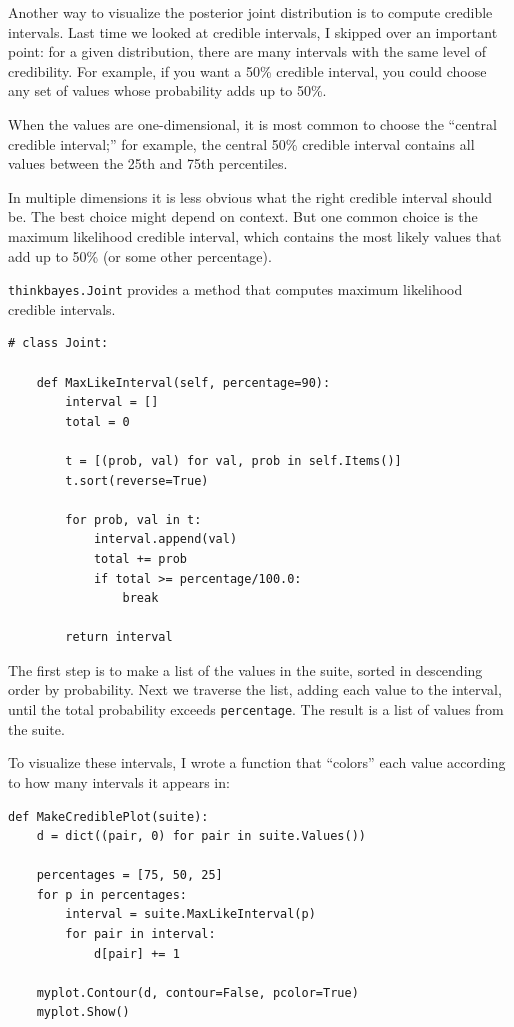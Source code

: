 \documentclass[12pt]{book}
\begin{document}
Another way to visualize the posterior joint distribution is to
compute credible intervals.  Last time we looked at credible intervals,
I skipped over an important point: for a given distribution, there
are many intervals with the same level of credibility.  For example,
if you want a 50\% credible interval, you could choose any set of
values whose probability adds up to 50\%.

When the values are one-dimensional, it is most common to choose
the ``central credible interval;'' for example, the central 50\%
credible interval contains all values between the 25th and 75th
percentiles.

In multiple dimensions it is less obvious what the right credible
interval should be.  The best choice might depend on context.  But
one common choice is the maximum likelihood credible interval, which
contains the most likely values that add up to 50\% (or some other
percentage).

{\tt thinkbayes.Joint} provides a method that computes maximum
likelihood credible intervals. 

\begin{verbatim}
# class Joint:

    def MaxLikeInterval(self, percentage=90):
        interval = []
        total = 0

        t = [(prob, val) for val, prob in self.Items()]
        t.sort(reverse=True)

        for prob, val in t:
            interval.append(val)
            total += prob
            if total >= percentage/100.0:
                break

        return interval
\end{verbatim}

The first step is to make a list of the values in the suite,
sorted in descending order by probability.  Next we traverse the
list, adding each value to the interval, until the total
probability exceeds {\tt percentage}.  The result is a list
of values from the suite.

To visualize these intervals, I wrote a function that ``colors''
each value according to how many intervals it appears in:

\begin{verbatim}
def MakeCrediblePlot(suite):
    d = dict((pair, 0) for pair in suite.Values())

    percentages = [75, 50, 25]
    for p in percentages:
        interval = suite.MaxLikeInterval(p)
        for pair in interval:
            d[pair] += 1

    myplot.Contour(d, contour=False, pcolor=True)
    myplot.Show()
\end{verbatim}
\end{document}
